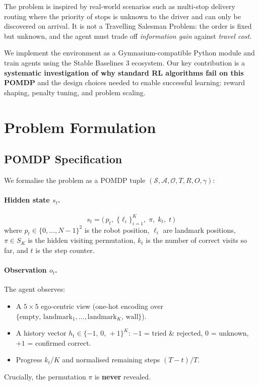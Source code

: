 \documentclass[11pt,a4paper]{article}
\begin{document}
The problem is inspired by real-world scenarios such as multi-stop delivery
routing where the priority of stops is unknown to the driver and can only be
discovered on arrival. It is not a Travelling Salesman Problem: the order is
fixed but unknown, and the agent must trade off \emph{information gain} against
\emph{travel cost}.

We implement the environment as a Gymnasium-compatible Python module and train
agents using the Stable Baselines 3 ecosystem. Our key contribution is a
\textbf{systematic investigation of why standard RL algorithms fail on this
POMDP} and the design choices needed to enable successful learning:
reward shaping, penalty tuning, and problem scaling.

\section{Problem Formulation}

\subsection{POMDP Specification}

We formalise the problem as a POMDP tuple $(\mathcal{S}, \mathcal{A},
\mathcal{O}, T, R, O, \gamma)$:

\paragraph{Hidden state $s_t$.}
\[
  s_t = \bigl(\, p_t,\; \{\ell_i\}_{i=1}^K,\; \pi,\; k_t,\; t \,\bigr)
\]
where $p_t \in \{0,\ldots,N{-}1\}^2$ is the robot position, $\ell_i$ are
landmark positions, $\pi \in S_K$ is the hidden visiting permutation, $k_t$ is
the number of correct visits so far, and $t$ is the step counter.

\paragraph{Observation $o_t$.}
The agent observes:
\begin{itemize}[nosep]
  \item A $5\times5$ ego-centric view (one-hot encoding over
        $\{\text{empty},\, \text{landmark}_1,\ldots,\text{landmark}_K,\, \text{wall}\}$).
  \item A history vector $h_t \in \{-1,\,0,\,+1\}^K$: $-1$ = tried \& rejected,
        $0$ = unknown, $+1$ = confirmed correct.
  \item Progress $k_t / K$ and normalised remaining steps $(T - t)/T$.
\end{itemize}
Crucially, the permutation $\pi$ is \textbf{never} revealed.
\end{document}
